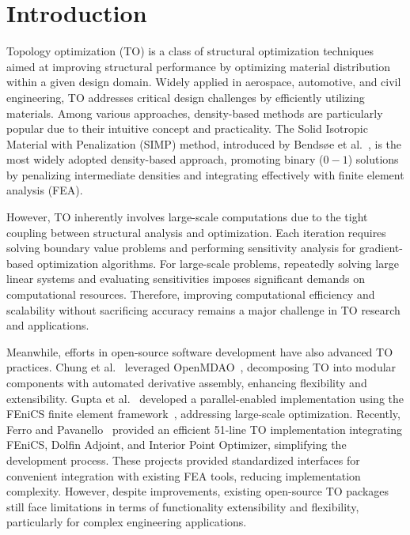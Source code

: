 \documentclass[mathpazo]{cicp}
\begin{document}
\maketitle


\section{Introduction}
Topology optimization (TO) is a class of structural optimization techniques aimed at improving structural performance by optimizing material distribution within a given design domain. Widely applied in aerospace, automotive, and civil engineering, TO addresses critical design challenges by efficiently utilizing materials. Among various approaches, density-based methods are particularly popular due to their intuitive concept and practicality. The Solid Isotropic Material with Penalization (SIMP) method, introduced by Bendsøe et al.~\cite{Bendsøe2004}, is the most widely adopted density-based approach, promoting binary ($0-1$) solutions by penalizing intermediate densities and integrating effectively with finite element analysis (FEA).

However, TO inherently involves large-scale computations due to the tight coupling between structural analysis and optimization. Each iteration requires solving boundary value problems and performing sensitivity analysis for gradient-based optimization algorithms. For large-scale problems, repeatedly solving large linear systems and evaluating sensitivities imposes significant demands on computational resources. Therefore, improving computational efficiency and scalability without sacrificing accuracy remains a major challenge in TO research and applications.

Meanwhile, efforts in open-source software development have also advanced TO practices. Chung et al.~\cite{chung2019topology} leveraged OpenMDAO~\cite{gray2019openmdao}, decomposing TO into modular components with automated derivative assembly, enhancing flexibility and extensibility. Gupta et al.~\cite{gupta202055} developed a parallel-enabled implementation using the FEniCS finite element framework~\cite{alnaes2015fenics}, addressing large-scale optimization. Recently, Ferro and Pavanello~\cite{ferro2023simple} provided an efficient 51-line TO implementation integrating FEniCS, Dolfin Adjoint, and Interior Point Optimizer, simplifying the development process. These projects provided standardized interfaces for convenient integration with existing FEA tools, reducing implementation complexity. However, despite improvements, existing open-source TO packages still face limitations in terms of functionality extensibility and flexibility, particularly for complex engineering applications.
\end{document}
